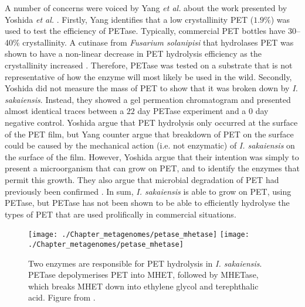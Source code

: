 A number of concerns \cite{Yang2016a} were voiced by Yang \emph{et al.} about the work presented by Yoshida \emph{et al.} \cite{Yoshida2016}. Firstly, Yang identifies that a low crystallinity PET ($1.9\%$) was used to test the efficiency of PETase. Typically, commercial PET bottles have \numrange{30}{40}$\%$ crystallinity. A cutinase from \emph{Fusarium solanipisi} that hydrolases PET was shown to have a non-linear decrease in PET hydrolysis efficiency as the crystallinity increased \cite{Vertommen2005}. Therefore, PETase was tested on a substrate that is not representative of how the enzyme will most likely be used in the wild. Secondly, Yoshida did not measure the mass of PET to show that it was broken down by \emph{I. sakaiensis}. Instead, they showed a gel permeation chromatogram and presented almost identical traces between a $22$ day PETase experiment and a $0$ day negative control. Yoshida argue that PET hydrolysis only occurred at the surface of the PET film, but Yang counter argue that breakdown of PET on the surface could be caused by the mechanical action (i.e. not enzymatic) of \emph{I. sakaiensis} on the surface of the film. However, Yoshida argue \cite{Yoshida2016a} that their intention was simply to present a microorganism that can grow on PET, and to identify the enzymes that permit this growth. They also argue that microbial degradation of PET had previously been confirmed \cite{Sharon2013}. In sum, \emph{I. sakaiensis} is able to grow on PET, using PETase, but PETase has not been shown to be able to efficiently hydrolyse the types of PET that are used prolifically in commercial situations.

\begin{figure}[!hbt]
    \centering
    \ifredact
        \texttt{[image: ./Chapter\_metagenomes/petase\_mhetase]}
    \else
        \texttt{[image: ./Chapter\_metagenomes/petase\_mhetase]}
    \fi
    \caption{%
        Two enzymes are responsible for PET hydrolysis in \emph{I. sakaiensis}.
        PETase depolymerises PET into MHET, followed by MHETase, which breaks MHET down into ethylene glycol and terephthalic acid.
        Figure from \cite{Bornscheuer2016}.
    }
    \label{fig:petase_mhetase}
\end{figure}

